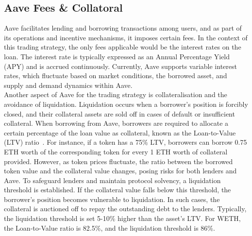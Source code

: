 \subsection{Aave Fees \& Collatoral}
Aave facilitates lending and borrowing transactions among users, and as part of its operations and incentive mechanisms, it imposes certain fees. In the context of this trading strategy, the only fees applicable would be the interest rates on the loan. The interest rate is typically expressed as an Annual Percentage Yield (APY) and is accrued continuously. Currently, Aave supports variable interest rates, which fluctuate based on market conditions, the borrowed asset, and supply and demand dynamics within Aave.
\\[3mm]
Another aspect of Aave for the trading strategy is collateralisation and the avoidance of liquidation. Liquidation occurs when a borrower's position is forcibly closed, and their collateral assets are sold off in cases of default or insufficient collateral. When borrowing from Aave, borrowers are required to allocate a certain percentage of the loan value as collateral, known as the Loan-to-Value (LTV) ratio~\cite{aave_risk}. For instance, if a token has a 75\% LTV, borrowers can borrow 0.75 ETH worth of the corresponding token for every 1 ETH worth of collateral provided. However, as token prices fluctuate, the ratio between the borrowed token value and the collateral value changes, posing risks for both lenders and Aave. To safeguard lenders and maintain protocol solvency, a liquidation threshold is established. If the collateral value falls below this threshold, the borrower's position becomes vulnerable to liquidation. In such cases, the collateral is auctioned off to repay the outstanding debt to the lenders. Typically, the liquidation threshold is set 5-10\% higher than the asset's LTV. For WETH, the Loan-to-Value ratio is 82.5\%, and the liquidation threshold is 86\%.

